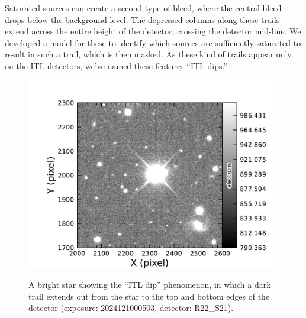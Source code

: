 Saturated sources can create a second type of bleed, where the central bleed drops below the background level.
The depressed columns along these trails extend across the entire height of the detector, crossing the detector mid-line.
We developed a model for these to identify which sources are sufficiently saturated to result in such a trail, which is then masked.  As these kind of trails appear only on the ITL detectors, we've named these features ``ITL dips.''


\begin{figure}[htb!]
  \centering
  \includegraphics[width=0.98\linewidth]{figures/dp1_isr_anomalies-itl_dip.pdf}
  \label{fig:anomalies_itl_dip}
  \caption{
    A bright star showing the ``ITL dip'' phenomenon, in which a dark trail extends out from the star to the top and bottom edges of the detector (exposure: 2024121000503, detector: R22\_S21).
  }
\end{figure}

